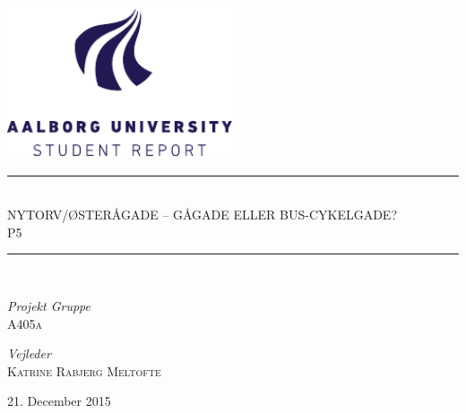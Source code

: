 \begin{titlepage}
\begin{center}
\newcommand{\HRule}{\rule{\linewidth}{0.5mm}}

\includegraphics[width=0.5\textwidth]{aau_logo_en.pdf}~\\[1cm]



\HRule \\[0.4cm]
{ \huge NYTORV/ØSTERÅGADE – GÅGADE ELLER BUS-CYKELGADE?\\[0.4cm]
  \large \textsc{P5}}

\HRule \\[1.5cm]

\begin{minipage}{0.4\textwidth}
\begin{flushleft} \large
\emph{Projekt Gruppe}\\
\textsc{A405a}
\end{flushleft}
\end{minipage}
\begin{minipage}{0.4\textwidth}
\begin{flushright} \large
\emph{Vejleder} \\
\textsc{Katrine Rabjerg Meltofte}
\end{flushright}
\end{minipage}

\vfill

{\large 21. December 2015}

\end{center}
\end{titlepage}
